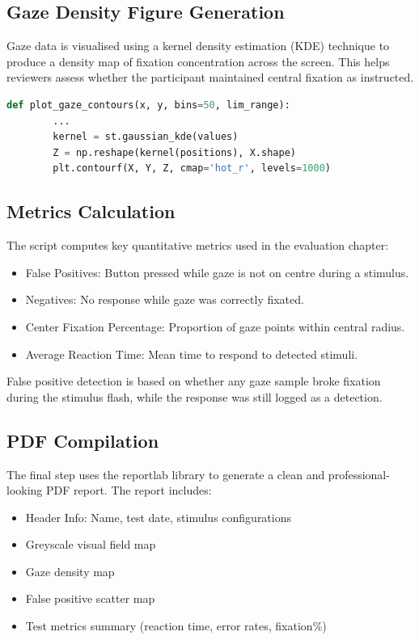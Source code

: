 \documentclass{l4proj}
\begin{document}
\begin{appendices}
\subsection{Gaze Density Figure Generation}
Gaze data is visualised using a kernel density estimation (KDE) technique to produce a density map of fixation concentration across the screen. This helps reviewers assess whether the participant maintained central fixation as instructed.

\begin{lstlisting}[language={Python}]
    def plot_gaze_contours(x, y, bins=50, lim_range):
        ...
        kernel = st.gaussian_kde(values)
        Z = np.reshape(kernel(positions), X.shape)
        plt.contourf(X, Y, Z, cmap='hot_r', levels=1000)
\end{lstlisting}

\subsection{Metrics Calculation}
The script computes key quantitative metrics used in the evaluation chapter:

\begin{itemize}
    \item False Positives: Button pressed while gaze is not on centre during a stimulus.
    \item Negatives: No response while gaze was correctly fixated.
    \item Center Fixation Percentage: Proportion of gaze points within central radius.
    \item Average Reaction Time: Mean time to respond to detected stimuli.
\end{itemize}

False positive detection is based on whether any gaze sample broke fixation during the stimulus flash, while the response was still logged as a detection.

\subsection{PDF Compilation}
The final step uses the reportlab library to generate a clean and professional-looking PDF report. The report includes:

\begin{itemize}
    \item Header Info: Name, test date, stimulus configurations
    \item Greyscale visual field map
    \item Gaze density map
    \item False positive scatter map
    \item Test metrics summary (reaction time, error rates, fixation\%)
\end{itemize}


\end{appendices}
\end{document}
